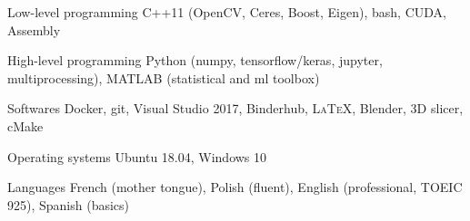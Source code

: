 


\begin{cvskills}


\cvskill
{Low-level programming} %
{C++11 (OpenCV, Ceres, Boost, Eigen), bash, CUDA, Assembly} %


\cvskill
{High-level programming} %
{Python (numpy, tensorflow/keras, jupyter, multiprocessing), MATLAB (statistical and ml toolbox)} %


\cvskill
{Softwares} %
{Docker, git, Visual Studio 2017, Binderhub, \textsc{\LaTeX}, Blender, 3D slicer, cMake} %


\cvskill
{Operating systems} %
{Ubuntu 18.04, Windows 10} %


\cvskill
{Languages} %
{French (mother tongue), Polish (fluent), English (professional, TOEIC 925), Spanish (basics)} %


\end{cvskills}
